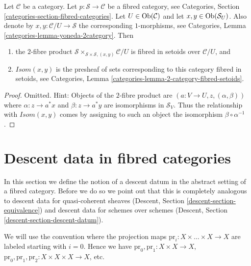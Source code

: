 \begin{lemma}
\label{lemma-isom-as-2-fibre-product}
Let $\mathcal{C}$ be a category.
Let $p : \mathcal{S} \to \mathcal{C}$ be a fibred category,
see Categories, Section \ref{categories-section-fibred-categories}.
Let $U \in \mathop{\mathrm{Ob}}\nolimits(\mathcal{C})$ and let $x, y \in \mathop{\mathrm{Ob}}\nolimits(\mathcal{S}_U)$.
Also denote by $x, y : \mathcal{C}/U \to \mathcal{S}$ the corresponding
$1$-morphisms, see
Categories, Lemma \ref{categories-lemma-yoneda-2category}.
Then
\begin{enumerate}
\item the $2$-fibre product
$\mathcal{S} \times_{\mathcal{S} \times \mathcal{S}, (x, y)} \mathcal{C}/U$
is fibred in setoids over $\mathcal{C}/U$, and
\item $\mathit{Isom}(x, y)$ is the presheaf of sets corresponding
to this category fibred in setoids, see
Categories, Lemma \ref{categories-lemma-2-category-fibred-setoids}.
\end{enumerate}
\end{lemma}

\begin{proof}
Omitted. Hint: Objects of the $2$-fibre product are
$(a : V \to U, z, (\alpha, \beta))$ where
$\alpha : z \to a^*x$ and $\beta : z \to a^*y$ are isomorphisms
in $\mathcal{S}_V$. Thus the relationship with $\mathit{Isom}(x, y)$
comes by assigning to such an object the isomorphism
$\beta \circ \alpha^{-1}$.
\end{proof}







\section{Descent data in fibred categories}
\label{section-descent-data}

\noindent
In this section we define the notion of a descent datum
in the abstract setting of a fibred category. Before we
do so we point out that this is completely analogous to
descent data for quasi-coherent sheaves
(Descent, Section \ref{descent-section-equivalence})
and descent data for schemes over schemes
(Descent, Section \ref{descent-section-descent-datum}).

\medskip\noindent
We will use the convention where the projection maps
$\text{pr}_i : X \times \ldots \times X \to X$
are labeled starting with $i = 0$. Hence we have
$\text{pr}_0, \text{pr}_1 : X \times X  \to X$,
$\text{pr}_0, \text{pr}_1, \text{pr}_2 : X \times X \times X  \to X$,
etc.

